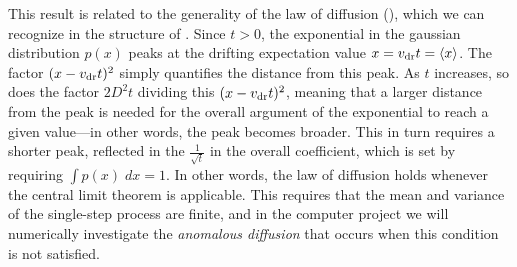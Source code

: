 This result is related to the generality of the law of diffusion (), which we can recognize in the structure of .
Since $t > 0$, the exponential in the gaussian distribution $p(x)$ peaks at the drifting expectation value $x = v_{\mathrm{dr}} t = \left\langle x \right\rangle$.
The factor $(x - v_{\mathrm{dr}} t)^2$ simply quantifies the distance from this peak.
As $t$ increases, so does the factor $2D^2 t$ dividing this $(x - v_{\mathrm{dr}} t)^2$, meaning that a larger distance from the peak is needed for the overall argument of the exponential to reach a given value---in other words, the peak becomes broader.
This in turn requires a shorter peak, reflected in the $\frac{1}{\sqrt{t}}$ in the overall coefficient, which is set by requiring $\int p(x) \; dx = 1$.
In other words, the law of diffusion holds whenever the central limit theorem is applicable.
This requires that the mean and variance of the single-step process are finite, and in the computer project we will numerically investigate the \textit{anomalous diffusion} that occurs when this condition is not satisfied.
